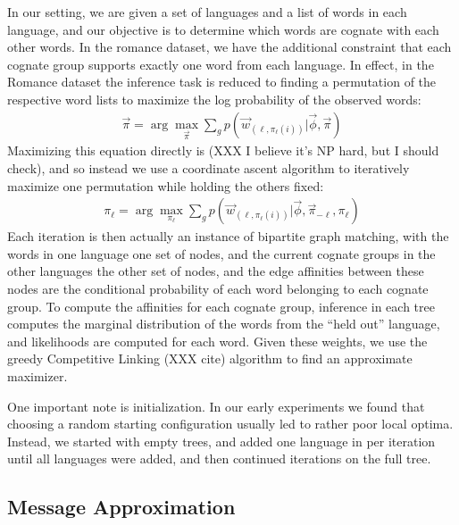 \documentclass[11pt,a4paper]{article}
\begin{document}
In our setting, we are given a set of languages and a list of words
in each language, and our objective is to determine which words are
cognate with each other words. In the romance dataset, we have the
additional constraint that each cognate group supports exactly one
word from each language. In effect, in the Romance dataset the 
inference task is reduced to finding a permutation of the respective
word lists to maximize the log probability of the observed words:
\begin{equation}
  \begin{split}
    \vec{\pi} = \arg\!\max_{\vec \pi} \sum_{g} p(\vec w_{(\ell,\pi_\ell(i))}|\vec \phi,\vec \pi)
   \end{split}
 \end{equation}
Maximizing this equation directly is (XXX I believe it's NP hard,
but I should check), and so instead we use a coordinate ascent
algorithm to iteratively maximize one permutation while holding the
others fixed:
\begin{equation}
  \begin{split}
    \pi_\ell = \arg\!\max_{\pi_\ell} \sum_{g} p(\vec w_{(\ell,\pi_\ell(i))}|\vec \phi,\vec \pi_{-\ell},\pi_\ell)
  \end{split}
\end{equation}
Each iteration is then actually an instance of bipartite graph
matching, with the words in one language one set of nodes, and the
current cognate groups in the other languages the other set of
nodes, and the edge affinities between these nodes are the conditional
probability of each word belonging to each cognate group. To compute
the affinities for each cognate group, inference in each tree
computes the marginal distribution of the words from the ``held
out'' language, and likelihoods are computed for each word.  Given
these weights, we use the greedy Competitive Linking (XXX cite)
algorithm to find an approximate maximizer.

One important note is initialization. In our early experiments we
found that choosing a random starting configuration usually led to
rather poor local optima. Instead, we started with empty trees, and
added one language in per iteration until all languages were added,
and then continued iterations on the full tree.

\subsection{Message Approximation}
\end{document}
